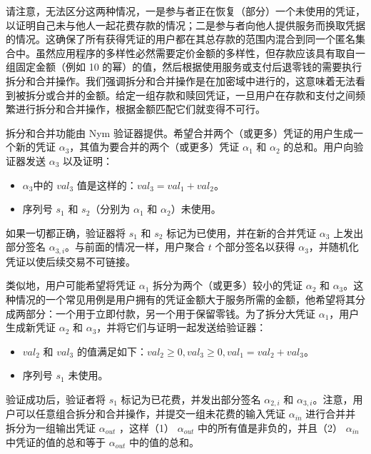 \documentclass{article}
\begin{document}
	请注意，无法区分这两种情况，一是参与者正在恢复（部分）一个未使用的凭证，以证明自己未与他人一起花费存款的情况；二是参与者向他人提供服务而换取凭据的情况。这确保了所有获得凭证的用户都在其总存款的范围内混合到同一个匿名集合中。虽然应用程序的多样性必然需要定价金额的多样性，但存款应该具有取自一组固定金额（例如 10 的幂）的值，然后根据使用服务或支付后退零钱的需要执行拆分和合并操作。我们强调拆分和合并操作是在加密域中进行的，这意味着无法看到被拆分或合并的金额。给定一组存款和赎回凭证，一旦用户在存款和支付之间频繁进行拆分和合并操作，根据金额匹配它们就变得不可行。\newline

	拆分和合并功能由 Nym 验证器提供。希望合并两个（或更多）凭证的用户生成一个新的凭证 $\alpha_{3}$，其值为要合并的两个（或更多）凭证 $\alpha_{1}$ 和 $\alpha_{2}$ 的总和。用户向验证器发送 $\alpha_{3}$ 以及证明：
	
\begin{itemize}
\item $\alpha_{3}$中的 $val_{3}$ 值是这样的：$val_{3} = val_{1} + val_{2}$。
\item 序列号 $s_{1}$ 和 $s_{2}$（分别为 $\alpha_{1}$ 和 $\alpha_{2}$）未使用。
\end{itemize}

	如果一切都正确，验证器将 $s_{1}$ 和 $s_{2}$ 标记为已使用，并在新的合并凭证 $\alpha_{3}$ 上发出部分签名 $\alpha_{3,i}$。与前面的情况一样，用户聚合 $t$ 个部分签名以获得 $\alpha_{3}$，并随机化凭证以使后续交易不可链接。\newline

	类似地，用户可能希望将凭证 $\alpha_{1}$ 拆分为两个（或更多）较小的凭证 $\alpha_{2}$ 和 $\alpha_{3}$。这种情况的一个常见用例是用户拥有的凭证金额大于服务所需的金额，他希望将其分成两部分：一个用于立即付款，另一个用于保留零钱。为了拆分大凭证 $\alpha_{1}$，用户生成新凭证 $\alpha_{2}$ 和 $\alpha_{3}$，并将它们与证明一起发送给验证器：
	
\begin{itemize}
\item $val_{2}$ 和 $val_{3}$ 的值满足如下：$val_{2}\ge 0, val_{3}\ge 0, val_{1} = val_{2} + val_{3}$。
\item 序列号 $s_{1}$ 未使用。
\end{itemize}

	验证成功后，验证者将 $s_{1}$ 标记为已花费，并发出部分签名 $\alpha_{2,i}$ 和 $\alpha_{3,i}$。注意，用户可以任意组合拆分和合并操作，并提交一组未花费的输入凭证 {$\alpha_{in}$} 进行合并并拆分为一组输出凭证 {$\alpha_{out}$} ，这样（1） {$\alpha_{out}$} 中的所有值是非负的，并且（2） {$\alpha_{in}$}  中凭证的值的总和等于 {$\alpha_{out}$} 中的值的总和。\newline
	
\end{document}
